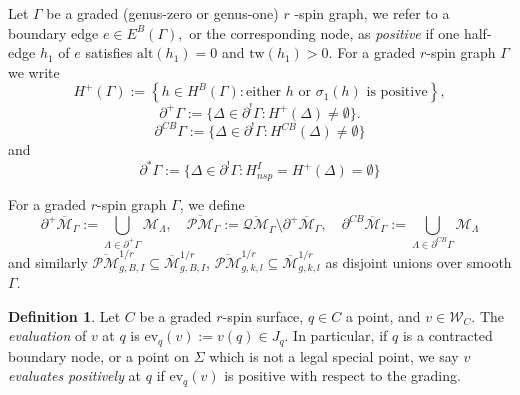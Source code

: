\documentclass[11pt]{amsart}
\theoremstyle{definition}
\newtheorem{definition}[dummy]{Definition}
\theoremstyle{remark}
\newcommand{\oPM}{{\overline{\mathcal{PM}}}^{1/r}}
\newcommand{\oPMb}{{\overline{\mathcal{PM}}}}
\newcommand{\oQMb}{{\overline{\mathcal{QM}}}}
\newcommand{\<}{\left<}
\renewcommand{\>}{\right>}
\numberwithin{equation}{section}
\def\Mbar{{\overline{\mathcal M}}}
\begin{document}
Let $\Gamma$ be a graded (genus-zero or genus-one) $r$%
-spin graph, we refer %
to a boundary %
edge $e\in E^B(\Gamma),$ or %
the %
corresponding node, as %
\textit{positive} if one half-edge $h_1$ of $e$ satisfies ${\text{alt}}(h_1) = 0$ and $\text{tw}(h_1) >0$.  For a graded $r$-spin graph $\Gamma$ we %
write $$H^+(\Gamma):=\left\{h\in H^B(\Gamma)\colon \text{either $h$ or $\sigma_1(h)$ is positive}\right\},$$ 
$$\partial^{+} \Gamma:=\{ {\Delta} \in \partial^{!} \Gamma \colon H^+({\Delta})\ne \emptyset \}.$$
$$\partial^{CB} \Gamma:=\{ {\Delta} \in \partial^{!} \Gamma \colon H^{CB}({\Delta})\ne \emptyset \}$$
and
$$
\partial^* \Gamma:= \{ {\Delta} \in \partial^! \Gamma \colon H^I_{nsp}=H^+({\Delta})= \emptyset \}
$$


For %
a graded $r$-spin graph $\Gamma$, we define
\[ \partial^+\Mbar_\Gamma:=\bigcup_{\Lambda\in\partial^+\Gamma}{\mathcal{M}}_\Lambda, \quad  \oPMb_\Gamma:= \oQMb_\Gamma\setminus
\partial^+\Mbar_\Gamma,\quad \partial^{CB}\Mbar_\Gamma:=\bigcup_{\Lambda\in\partial^{CB}\Gamma}{\mathcal{M}}_\Lambda\]
and similarly $\oPM_{g,B,I}\subseteq \Mbar^{1/r}_{g,B,I}$, $\oPM_{g,k,l}\subseteq \Mbar^{1/r}_{g,k,l}$ as disjoint unions over smooth $\Gamma$.




\begin{definition}
Let $C$ be a graded $r$-spin surface, $q\in C$ a point, and $v\in{\mathcal{W}}_C$. The \textit{evaluation} of $v$ at $q$ is $\text{ev}_q(v) := v(q) \in J_q$. In particular, if $q$ is a contracted boundary node, or a point on $\Sigma$ which is not a legal special point, we say $v$ \textit{evaluates positively} at $q$ if $\text{ev}_q(v)$ is positive with respect to the grading.
\end{definition}
\end{document}
